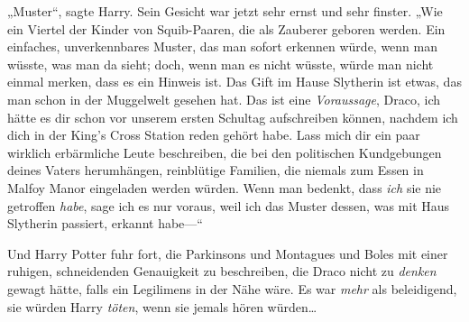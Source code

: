 „Muster“, sagte Harry. Sein Gesicht war jetzt sehr ernst und sehr finster. „Wie ein Viertel der Kinder von Squib-Paaren, die als Zauberer geboren werden. Ein einfaches, unverkennbares Muster, das man sofort erkennen würde, wenn man wüsste, was man da sieht; doch, wenn man es nicht wüsste, würde man nicht einmal merken, dass es ein Hinweis ist. Das Gift im Hause Slytherin ist etwas, das man schon in der Muggelwelt gesehen hat. Das ist eine \emph{Voraussage}, Draco, ich hätte es dir schon vor unserem ersten Schultag aufschreiben können, nachdem ich dich in der King’s Cross Station reden gehört habe. Lass mich dir ein paar wirklich erbärmliche Leute beschreiben, die bei den politischen Kundgebungen deines Vaters herumhängen, reinblütige Familien, die niemals zum Essen in Malfoy Manor eingeladen werden würden. Wenn man bedenkt, dass \emph{ich} sie nie getroffen \emph{habe}, sage ich es nur voraus, weil ich das Muster dessen, was mit Haus Slytherin passiert, erkannt habe—“

Und Harry Potter fuhr fort, die Parkinsons und Montagues und Boles mit einer ruhigen, schneidenden Genauigkeit zu beschreiben, die Draco nicht zu \emph{denken} gewagt hätte, falls ein Legilimens in der Nähe wäre. Es war \emph{mehr} als beleidigend, sie würden Harry \emph{töten}, wenn sie jemals hören würden…

